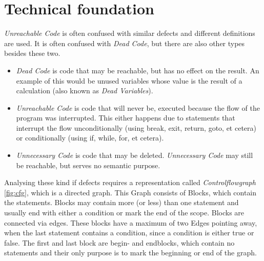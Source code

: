 \section{Technical foundation}
\emph{Unreachable Code} is often confused with similar defects and different definitions are used.
It is often confused with \emph{Dead Code}, but there are also other types besides these two.
\begin{itemize}
  \item \emph{Dead Code} is code that may be reachable, but has no effect on the result. An example of this would be unused variables whose value is the result of a calculation (also known as \emph{Dead Variables}).
  \item \emph{Unreachable Code} is code that will never be, executed because the flow of the program was interrupted.
        This either happens due to statements that interrupt the flow unconditionally (using break, exit, return, goto, et cetera) or conditionally (using if, while, for, et cetera).
  \item \emph{Unnecessary Code} is code that may be deleted. \emph{Unnecessary Code} may still be reachable, but serves no semantic purpose.
\end{itemize}

Analysing these kind if defects requires a representation called \emph{Controlflowgraph} \ref{fig:cfg}, which is a directed graph.
This Graph consists of Blocks, which contain the statements.
Blocks may contain more (or less) than one statement and usually end with either a condition or mark the end of the scope.
Blocks are connected via edges.
These blocks have a maximum of two Edges pointing away, when the last statement contains a condition, since a condition is either true or false.
The first and last block are begin- and endblocks, which contain no statements and their only purpose is to mark the beginning or end of the graph.

